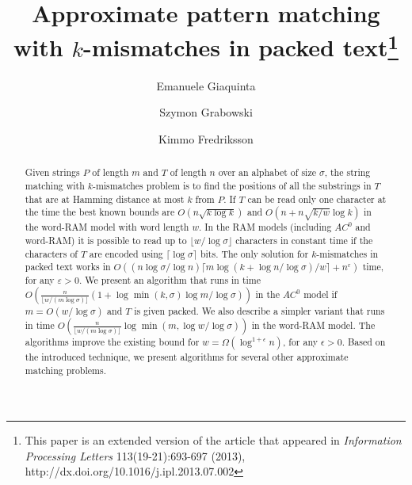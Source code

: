 \documentclass{llncs}
\newcommand{\ceil}[1]{\lceil #1 \rceil}
\newcommand{\floor}[1]{\lfloor #1 \rfloor}
\newcommand{\sabound}{$O((n \log\sigma/\log n)\ceil{m \log (k +  \log n / \log\sigma) / w} + n^{\varepsilon})$\xspace}
\newcommand{\acbound}{$O(\frac{n}{\floor{w/(m\log\sigma)}} (1 + \log \min(k,\sigma) \log m / \log\sigma))$\xspace}
\newcommand{\wrbound}{$O(\frac{n}{\floor{w/(m\log\sigma)}}\log \min(m, \log w / \log\sigma))$\xspace}
\begin{document}
\title{Approximate pattern matching with $k$-mismatches in packed text\thanks{This paper is an extended version of the article that appeared in \emph{Information Processing Letters} 113(19-21):693-697 (2013), http://dx.doi.org/10.1016/j.ipl.2013.07.002}}

\author{Emanuele Giaquinta \and Szymon Grabowski \and Kimmo Fredriksson}


\maketitle

\begin{abstract}
Given strings $P$ of length $m$ and $T$ of length $n$ over an alphabet
of size $\sigma$, the string matching with $k$-mismatches problem is
to find the positions of all the substrings in $T$ that are at Hamming
distance at most $k$ from $P$. If $T$ can be read only one character
at the time the best known bounds are $O(n\sqrt{k\log k})$ and $O(n +
n\sqrt{k/w}\log k)$ in the word-RAM model with word length $w$.
In the RAM models (including $AC^0$ and word-RAM)
it is possible to read up
to $\floor{w / \log \sigma}$ characters in constant time if the
characters of $T$ are encoded using $\ceil{\log \sigma}$ bits. The
only solution for $k$-mismatches in packed text works in \sabound
time, for any $\varepsilon > 0$. We present an algorithm that runs in
time \acbound in the $AC^0$ model if $m=O(w / \log\sigma)$ and $T$ is
given packed. We also describe a simpler variant that runs in time
\wrbound in the word-RAM model. The algorithms improve the existing
bound for $w = \Omega(\log^{1+\epsilon}n)$, for any $\epsilon > 0$. Based on the introduced technique, we present
algorithms for several other approximate matching problems.
\end{abstract}
\end{document}
